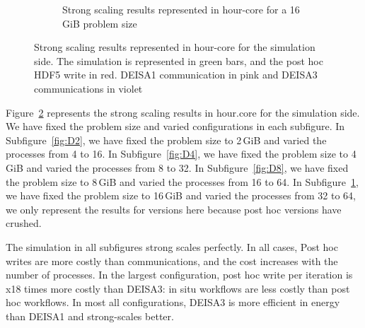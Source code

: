\begin{figure}[hb]
\begin{subfigure}[b]{0.4\textwidth}
         \caption{Strong scaling results represented in hour-core for a 16\,GiB problem size}
         \label{fig:D16}
     \end{subfigure}
        \caption{Strong scaling results represented in hour-core for the simulation side. The simulation is represented in green bars, and the post hoc HDF5 write in red. DEISA1 communication in pink and DEISA3 communications in violet}
        \label{fig:strong}
\end{figure}

Figure~\ref{fig:strong} represents the strong scaling results in  hour.core for the simulation side. We have fixed the problem size and varied configurations in each subfigure. 
In Subfigure~\ref{fig:D2}, we have fixed the problem size to 2\,GiB and varied the processes from 4 to 16.
In Subfigure~\ref{fig:D4}, we have fixed the problem size to 4\,GiB and varied the processes from 8 to 32.
In Subfigure~\ref{fig:D8}, we have fixed the problem size to 8\,GiB and varied the processes from 16 to 64.
In Subfigure~\ref{fig:D16}, we have fixed the problem size to 16\,GiB and varied the processes from 32 to 64, we only represent the results for \deisa versions here because post hoc versions have crushed.

The simulation in all subfigures strong scales perfectly. 
In all cases, Post hoc writes are more costly than \deisa communications, and the cost increases with the number of processes. In the largest configuration, post hoc write per iteration is x18 times more costly than DEISA3: in situ workflows are less costly than post hoc workflows.
In most all configurations, DEISA3 is more efficient in energy than DEISA1 and strong-scales better. 

